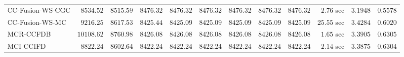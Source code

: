\begin{table}[H]
\begin{tabular}{lrrrrrrrrrrr}
    CC-Fusion-WS-CGC & $      8534.52$ & $      8515.59$ & $      8476.32$ & $      8476.32$ & $      8476.32$ & $      8476.32$ & $      8476.32$ & $      8476.32$ & $         2.76$ sec    & $       3.1948$  & $       0.5578$ \\ 
     CC-Fusion-WS-MC & $      9216.25$ & $      8617.53$ & $      8425.44$ & $      8425.09$ & $      8425.09$ & $      8425.09$ & $      8425.09$ & $      8425.09$ & $        25.55$ sec    & $       3.4284$  & $       0.6020$ \\ 
\cmidrule{1-1} 
           MCR-CCFDB & $     10108.62$ & $      8760.98$ & $      8426.08$ & $      8426.08$ & $      8426.08$ & $      8426.08$ & $      8426.08$ & $      8426.08$ & $         1.65$ sec    & $       3.3905$  & $       0.6305$ \\ 
\cmidrule{1-1} 
           MCI-CCIFD & $      8822.24$ & $      8602.64$ & $      8422.24$ & $      8422.24$ & $      8422.24$ & $      8422.24$ & $      8422.24$ & $      8422.24$ & $         2.14$ sec    & $       3.3875$  & $       0.6304$ \\ 
\bottomrule
\end{tabular}
\end{table}


